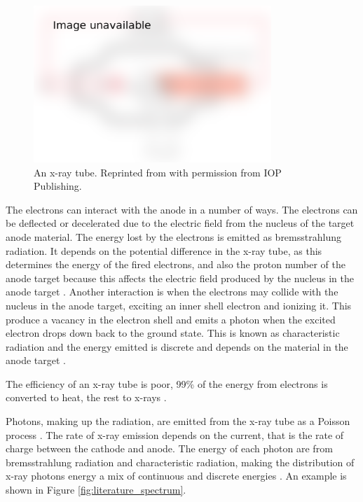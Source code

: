 \begin{figure}
  \centering
  \includegraphics[width=0.8\textwidth]{../figures/literatureReview/literature_tube.png}
  \caption{An x-ray tube. Reprinted from \cite{michael2001x} with permission from IOP Publishing.}
  \label{fig:literature_tube}
\end{figure}

The electrons can interact with the anode in a number of ways. The electrons can be deflected or decelerated due to the electric field from the nucleus of the target anode material. The energy lost by the electrons is emitted as bremsstrahlung radiation. It depends on the potential difference in the x-ray tube, as this determines the energy of the fired electrons, and also the proton number of the anode target because this affects the electric field produced by the nucleus in the anode target \citep{sun2012overview}. Another interaction is when the electrons may collide with the nucleus in the anode target, exciting an inner shell electron and ionizing it. This produce a vacancy in the electron shell and emits a photon when the excited electron drops down back to the ground state. This is known as characteristic radiation and the energy emitted is discrete and depends on the material in the anode target \citep{sun2012overview}.

The efficiency of an x-ray tube is poor, 99\% of the energy from electrons is converted to heat, the rest to x-rays \citep{kruth2011computed}.

Photons, making up the radiation, are emitted from the x-ray tube as a Poisson process \citep{cierniak2011x}. The rate of x-ray emission depends on the current, that is the rate of charge between the cathode and anode. The energy of each photon are from bremsstrahlung radiation and characteristic radiation, making the distribution of x-ray photons energy a mix of continuous and discrete energies \citep{sun2012overview}. An example is shown in Figure \ref{fig:literature_spectrum}.

